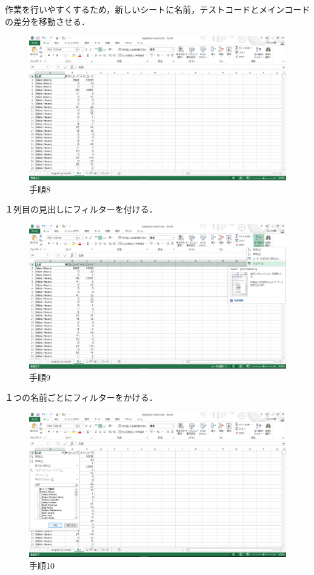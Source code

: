 \newpage

作業を行いやすくするため，新しいシートに名前，テストコードとメインコードの差分を移動させる．

\begin{figure}[h]
\centering
\includegraphics[width=13cm]{process8.png}
\caption{手順8}
\end{figure}

１列目の見出しにフィルターを付ける．

\begin{figure}[h]
\centering
\includegraphics[width=13cm]{process9.png}
\caption{手順9}
\end{figure}

\newpage

１つの名前ごとにフィルターをかける．

\begin{figure}[h]
\centering
\includegraphics[width=13cm]{process10.png}
\caption{手順10}
\end{figure}


